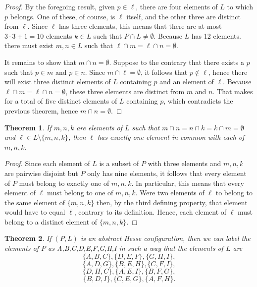 \documentclass[12pt]{article}
\newtheorem{thm}{Theorem}
\begin{document}
\begin{proof}
By the foregoing result, given $p \in \ell$, there are four
elements of $L$ to which $p$ belongs.  One of these, of course,
is $\ell$ itself, and the other three are distinct from $\ell$.
Since $\ell$ has three elements, this means that there are at
most $3 \cdot 3 + 1 = 10$ elements $k \in L$ such that 
$P \cap L \neq \emptyset$.  Because $L$ has 12 elements. there
must exist $m,n \in L$ such that $\ell \cap m = \ell \cap n = 
\emptyset$.

It remains to show that $m \cap n = \emptyset$.  Suppose to the
contrary that there exists a $p$ such that $p \in m$ and 
$p \in n$.  Since $m \cap \ell = \emptyset$, it follows that 
$p \notin \ell$, hence there will exist three distinct elements
of $L$ containing $p$ and an element of $\ell$.  Because 
$\ell \cap m = \ell \cap n = \emptyset$, these three elements 
are distinct from $m$ and $n$.  That makes for a total of
five distinct elements of $L$ containing $p$, which
contradicts the previous theorem, hence $m \cap n = \emptyset$.
\end{proof}

\begin{thm}
If $m,n,k$ are elements of $L$ such that $m \cap n = n \cap k 
= k \cap m = \emptyset$ and $\ell \in L \setminus \{m,n,k\}$, 
then $\ell$ has exactly one element in common with each of $m,n,k$.
\end{thm}

\begin{proof}
Since each element of $L$ is a subset of $P$ with three elements
and $m,n,k$ are pairwise disjoint but $P$ only has nine
elements, it follows that every element of $P$ must belong
to exactly one of $m,n,k$.  In particular, this means that 
every element of $\ell$ must belong to one of $m,n,k$.  Were
two elements of $\ell$ to belong to the same element of 
$\{m,n,k\}$ then, by the third defining property, that element
would have to equal $\ell$, contrary to its definition.  Hence,
each element of $\ell$ must belong to a distinct element of 
$\{m,n,k\}$.
\end{proof}

\begin{thm}
If $(P,L)$ is an abstract Hesse configuration, then we can
label the elements of $P$ as A,B,C,D,E,F,G,H,I in such a way
that the elements of $L$ are 
\[\{A,B,C\}, \{D,E,F\}, \{G,H,I\}, \]
\[\{A,D,G\}, \{B,E,H\}, \{C,F,I\}, \]
\[\{D,H,C\}, \{A,E,I\}, \{B,F,G\}, \]
\[\{B,D,I\}, \{C,E,G\}, \{A,F,H\}. \]
\end{thm}
\end{document}
